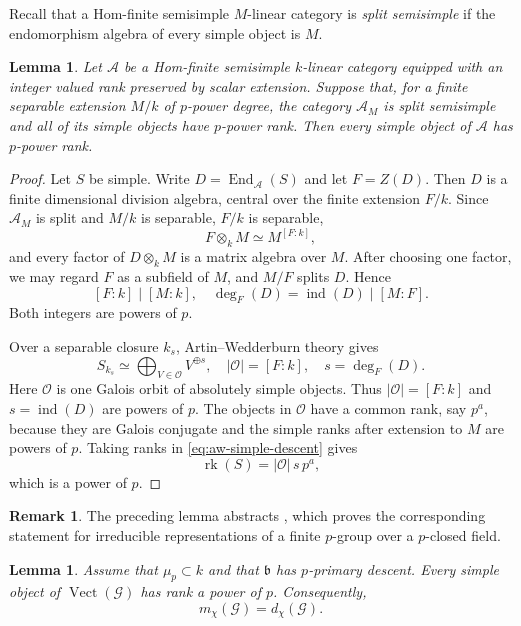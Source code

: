 \documentclass[11pt,reqno]{amsart}
\numberwithin{equation}{section}
\theoremstyle{plain}
\newtheorem{lemm}[prop]{Lemma}
\theoremstyle{definition}
\newtheorem{rema}[prop]{Remark}
\def\cA{{\mathcal A}}
\def\cG{{\mathcal G}}
\def\ind{{\operatorname{ind}}}
\def\rk{{\operatorname{rk}}}
\def\Vect{{\operatorname{Vect}}}
\def\band{{\mathfrak b}}
\begin{document}
Recall that a Hom-finite semisimple $M$-linear category is
\emph{split semisimple} if the endomorphism algebra of every simple object
is $M$.

\begin{lemm}\label{lem:semisimple-p-descent}
Let $\cA$ be a Hom-finite semisimple $k$-linear category equipped with an
integer valued rank preserved by scalar extension.  Suppose that, for a
finite separable extension $M/k$ of $p$-power degree, the category
$\cA_M$ is split semisimple and all of its simple objects have
$p$-power rank.  Then every simple object of $\cA$ has $p$-power
rank.
\end{lemm}

\begin{proof}
Let $S$ be simple.  Write
$D=\operatorname{End}_{\cA}(S)$ and let $F=Z(D)$.
Then $D$ is a finite dimensional division algebra, central over the
finite extension $F/k$.  Since $\cA_M$ is split and $M/k$ is
separable, $F/k$ is separable,
\[
F\otimes_kM\simeq M^{[F:k]},
\]
and every factor of $D\otimes_kM$ is a matrix algebra over $M$.
After choosing one factor, we may regard $F$ as a subfield of $M$,
and $M/F$ splits $D$.  Hence
\[
[F:k]\mid[M:k],
\quad
\deg_F(D)=\ind(D)\mid[M:F].
\]
Both integers are powers of $p$.

Over a separable closure $k_s$, Artin--Wedderburn theory gives
\begin{equation}\label{eq:aw-simple-descent}
S_{k_s}\simeq
\bigoplus_{V\in\mathcal O}V^{\oplus s},
\quad
|\mathcal O|=[F:k],
\quad
s=\deg_F(D).
\end{equation}
Here $\mathcal O$ is one Galois orbit of absolutely simple objects.
Thus $|\mathcal O|=[F:k]$ and $s=\ind(D)$ are powers of $p$.
The objects in $\mathcal O$ have a common rank, say $p^a$, because
they are Galois conjugate and the simple ranks after extension to $M$
are powers of $p$.
Taking ranks in \eqref{eq:aw-simple-descent} gives
\[
\rk(S)=|\mathcal O|\,s\,p^a,
\]
which is a power of $p$.
\end{proof}

\begin{rema}\label{rem:semisimple-descent-lmmr}
The preceding lemma abstracts \cite[Lemma~5.2]{LMMRTori}, which proves the
corresponding statement for irreducible representations of a finite
$p$-group over a $p$-closed field.
\end{rema}

\begin{lemm}\label{lem:p-power-ranks-main}
Assume that $\mu_p\subset k$ and that $\band$ has $p$-primary
descent.  Every simple object of
$\Vect(\cG)$ has rank a power of $p$.  Consequently,
\begin{equation}\label{eq:block-gcd}
m_\chi(\cG)=d_\chi(\cG).
\end{equation}
\end{lemm}
\end{document}
